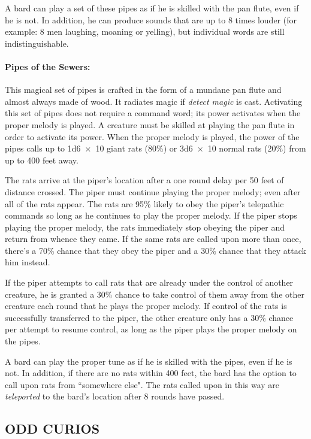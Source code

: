 \begin{multicols}{2}
A bard can play a set of these pipes as if he is skilled with the pan flute, even if he is not.  In addition, he can produce sounds that are up to 8 times louder (for example: 8 men laughing, moaning or yelling), but individual words are still indistinguishable.
 
\paragraph{Pipes of the Sewers:} This magical set of pipes is crafted in the form of a mundane pan flute and almost always made of wood.  It radiates magic if \textit{detect magic} is cast.  Activating this set of pipes does not require a command word; its power activates when the proper melody is played.  A creature must be skilled at playing the pan flute in order to activate its power.  When the proper melody is played, the power of the pipes calls up to 1d6~$\times$~10 giant rats (80\%) or 3d6~$\times$~10 normal rats (20\%) from up to 400 feet away.  

The rats arrive at the piper's location after a one round delay per 50 feet of distance crossed.  The piper must continue playing the proper melody; even after all of the rats appear.  The rats are 95\% likely to obey the piper's telepathic commands so long as he continues to play the proper melody.  If the piper stops playing the proper melody, the rats immediately stop obeying the piper and return from whence they came.  If the same rats are called upon more than once, there's a 70\% chance that they obey the piper and a 30\% chance that they attack him instead.  

If the piper attempts to call rats that are already under the control of another creature, he is granted a 30\% chance to take control of them away from the other creature each round that he plays the proper melody.  If control of the rats is successfully transferred to the piper, the other creature only has a 30\% chance per attempt to resume control, as long as the piper plays the proper melody on the pipes.

A bard can play the proper tune as if he is skilled with the pipes, even if he is not.  In addition, if there are no rats within 400 feet, the bard has the option to call upon rats from ``somewhere else".  The rats called upon in this way are \textit{teleported} to the bard's location after 8 rounds have passed.

\subsection{ODD CURIOS}


\end{multicols}
